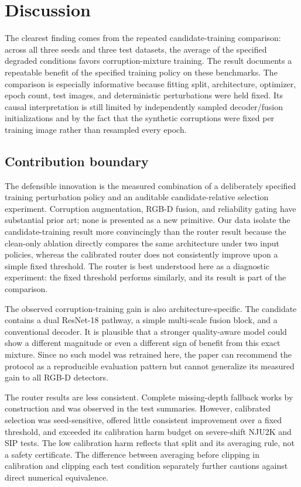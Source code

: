 \documentclass[11pt]{article}
\begin{document}
\section{Discussion}
The clearest finding comes from the repeated candidate-training comparison: across all three seeds and three test datasets, the average of the specified degraded conditions favors corruption-mixture training. The result documents a repeatable benefit of the specified training policy on these benchmarks. The comparison is especially informative because fitting split, architecture, optimizer, epoch count, test images, and deterministic perturbations were held fixed. Its causal interpretation is still limited by independently sampled decoder/fusion initializations and by the fact that the synthetic corruptions were fixed per training image rather than resampled every epoch.

\subsection{Contribution boundary}
The defensible innovation is the measured combination of a deliberately specified training perturbation policy and an auditable candidate-relative selection experiment. Corruption augmentation, RGB-D fusion, and reliability gating have substantial prior art; none is presented as a new primitive. Our data isolate the candidate-training result more convincingly than the router result because the clean-only ablation directly compares the same architecture under two input policies, whereas the calibrated router does not consistently improve upon a simple fixed threshold. The router is best understood here as a diagnostic experiment: the fixed threshold performs similarly, and its result is part of the comparison.

The observed corruption-training gain is also architecture-specific. The candidate contains a dual ResNet-18 pathway, a simple multi-scale fusion block, and a conventional decoder. It is plausible that a stronger quality-aware model could show a different magnitude or even a different sign of benefit from this exact mixture. Since no such model was retrained here, the paper can recommend the protocol as a reproducible evaluation pattern but cannot generalize its measured gain to all RGB-D detectors.

The router results are less consistent. Complete missing-depth fallback works by construction and was observed in the test summaries. However, calibrated selection was seed-sensitive, offered little consistent improvement over a fixed threshold, and exceeded its calibration harm budget on severe-shift NJU2K and SIP tests. The low calibration harm reflects that split and its averaging rule, not a safety certificate. The difference between averaging before clipping in calibration and clipping each test condition separately further cautions against direct numerical equivalence.
\end{document}
